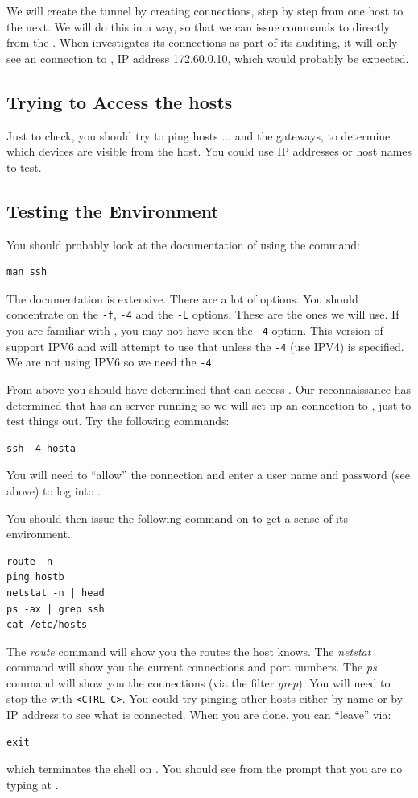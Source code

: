 We will create the tunnel by creating \ssh connections, step by step
from one host to the next.  We will do this in a way, so that we can
issue commands to  directly from the \base. When 
investigates its connections as part of its auditing, it will only see
an \ssh connection to , IP address 172.60.0.10, which would
probably be expected.

\subsection{Trying to Access the hosts}

Just to check, you should try to ping hosts 
$\ldots$  and the gateways, to determine which devices
are visible from the \base host. You could use IP addresses or host
names to test. 

\subsection{Testing the Environment}
You should probably look at the documentation of \ssh using the command: 
\begin{verbatim}
man ssh
\end{verbatim}
The documentation is extensive. There are a lot of options.  You
should concentrate on the \verb|-f|, \verb|-4| and the \verb|-L|
options. These are the ones we will use.  If you are familiar with
\ssh, you may not have seen the \verb|-4| option.  This version of
\ssh support IPV6 and will attempt to use that unless the \verb|-4|
(use IPV4) is specified.  We are not using IPV6 so we need the
\verb|-4|.

From above you should have determined that \base can access
.  Our reconnaissance has determined that 
has an \ssh server running so we will set up an \ssh connection to
, just to test things out. Try the following commands:
\begin{verbatim}
ssh -4 hosta
\end{verbatim}
You will need to ``allow'' the connection and enter a user name and
password (see above) to log into .

You should then issue the following command on  to get a sense
of its environment.
\begin{verbatim}
route -n
ping hostb
netstat -n | head
ps -ax | grep ssh
cat /etc/hosts
\end{verbatim}
The \textit{route} command will show you the routes the host knows.
The \textit{netstat} command will show you the current connections and
port numbers. The \textit{ps} command will show you the \ssh
connections (via the filter \textit{grep}).  
You will need to stop the \ping with \texttt{<CTRL-C>}.  You could try
pinging other hosts either by name or by IP address to see what is
connected. When you are done, you can ``leave''  via:
\begin{verbatim}
exit
\end{verbatim}
which terminates the shell on .  You should see from the
prompt that you are no typing at \base. 
